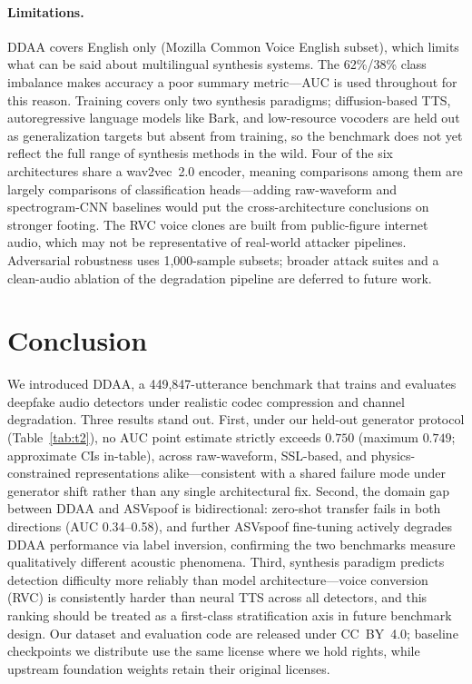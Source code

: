 \documentclass{article}
\newcommand{\ddaa}{\textsc{DDAA}}
\begin{document}
\paragraph{Limitations.}
\ddaa{} covers English only (Mozilla Common Voice English subset), which
limits what can be said about multilingual synthesis systems.  The 62\%/38\%
class imbalance makes accuracy a poor summary metric---AUC is used throughout
for this reason.  Training covers only two synthesis paradigms; diffusion-based
TTS, autoregressive language models like Bark, and low-resource vocoders are
held out as generalization targets but absent from training, so the benchmark
does not yet reflect the full range of synthesis methods in the wild.  Four of
the six architectures share a wav2vec~2.0 encoder, meaning comparisons among
them are largely comparisons of classification heads---adding raw-waveform and
spectrogram-CNN baselines would put the cross-architecture conclusions on
stronger footing.  The RVC voice clones are built from public-figure internet
audio, which may not be representative of real-world attacker pipelines.
Adversarial robustness uses 1{,}000-sample subsets; broader attack suites and a
clean-audio ablation of the degradation pipeline are deferred to future work.

\section{Conclusion}
\label{sec:conclusion}

We introduced \ddaa, a 449,847-utterance benchmark that trains and evaluates
deepfake audio detectors under realistic codec compression and channel
degradation.  Three results stand out.  First, under our held-out generator
protocol (Table~\ref{tab:t2}), no AUC point estimate strictly exceeds $0.750$
(maximum $0.749$; approximate CIs in-table), across raw-waveform, SSL-based,
and physics-constrained representations alike---consistent with a shared
failure mode under generator shift rather than any single architectural fix.
Second, the domain gap between \ddaa{} and
ASVspoof is bidirectional: zero-shot transfer fails in both directions
(AUC 0.34--0.58), and further ASVspoof fine-tuning actively degrades \ddaa{}
performance via label inversion, confirming the two benchmarks measure
qualitatively different acoustic phenomena.  Third, synthesis paradigm
predicts detection difficulty more reliably than model architecture---voice
conversion (RVC) is consistently harder than neural TTS across all detectors,
and this ranking should be treated as a first-class stratification axis in
future benchmark design.  Our dataset and evaluation code are released under
CC~BY~4.0; baseline checkpoints we distribute use the same license where we
hold rights, while upstream foundation weights retain their original licenses.
\end{document}

